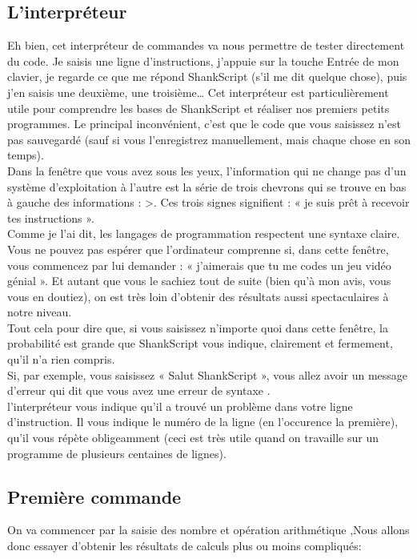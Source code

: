 \subsection{L'interpréteur}

Eh bien, cet interpréteur de commandes va nous permettre de tester directement du code. Je saisis une ligne d'instructions, j'appuie sur la touche Entrée de mon clavier, je regarde ce que me répond ShankScript (s'il me dit quelque chose), puis j'en saisis une deuxième, une troisième… Cet interpréteur est particulièrement utile pour comprendre les bases de ShankScript et réaliser nos premiers petits programmes. Le principal inconvénient, c'est que le code que vous saisissez n'est pas sauvegardé (sauf si vous l'enregistrez manuellement, mais chaque chose en son temps).
\\[0.5cm]
Dans la fenêtre que vous avez sous les yeux, l'information qui ne change pas d'un système d'exploitation à l'autre est la série de trois chevrons qui se trouve en bas à gauche des informations : >. Ces trois signes signifient : « je suis prêt à recevoir tes instructions ».
\\[0.5cm]
Comme je l'ai dit, les langages de programmation respectent une syntaxe claire. Vous ne pouvez pas espérer que l'ordinateur comprenne si, dans cette fenêtre, vous commencez par lui demander : « j'aimerais que tu me codes un jeu vidéo génial ». Et autant que vous le sachiez tout de suite (bien qu'à mon avis, vous vous en doutiez), on est très loin d'obtenir des résultats aussi spectaculaires à notre niveau.
\\[0.5cm]
Tout cela pour dire que, si vous saisissez n'importe quoi dans cette fenêtre, la probabilité est grande que ShankScript vous indique, clairement et fermement, qu'il n'a rien compris.
\\[0.4cm]
Si, par exemple, vous saisissez « Salut ShankScript », vous allez avoir un message d'erreur qui dit que vous avez une erreur de syntaxe .
\\[0.5cm]
l'interpréteur vous indique qu'il a trouvé un problème dans votre ligne d'instruction. Il vous indique le numéro de la ligne (en l'occurence la première), qu'il vous répète obligeamment (ceci est très utile quand on travaille sur un programme de plusieurs centaines de lignes).  	 	


\subsection{Première commande}
On va commencer par la saisie des nombre et opération arithmétique ,Nous allons donc essayer d'obtenir les résultats de calculs plus ou moins compliqués:

